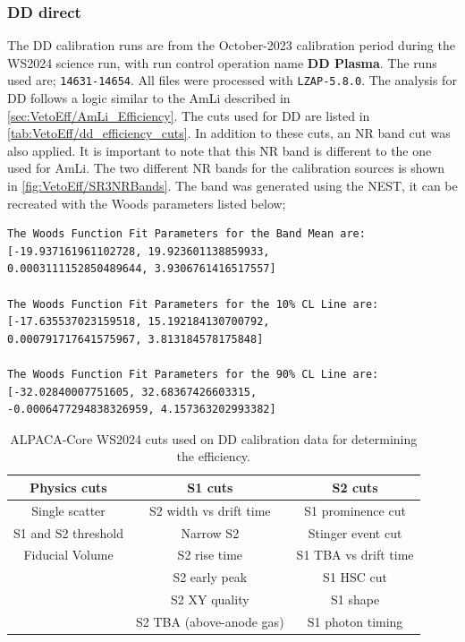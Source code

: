 \subsubsection{DD direct}
The DD calibration runs are from the October-2023 calibration period during the WS2024 science run, with run control operation name \textbf{DD Plasma}.
The runs used are; \lstinline{14631-14654}.
All files were processed with \lstinline{LZAP-5.8.0}.
The analysis for DD follows a logic similar to the AmLi described in \autoref{sec:VetoEff/AmLi_Efficiency}.
The cuts used for DD are listed in \autoref{tab:VetoEff/dd_efficiency_cuts}.
In addition to these cuts, an NR band cut was also applied.
It is important to note that this NR band is different to the one used for AmLi. The two different NR bands for the calibration sources is shown in \autoref{fig:VetoEff/SR3NRBands}.
The band was generated using the NEST, it can be recreated with the Woods parameters listed below;
\begin{lstlisting}[backgroundcolor = \color{lightgray}]
The Woods Function Fit Parameters for the Band Mean are:
[-19.937161961102728, 19.923601138859933,
0.0003111152850489644, 3.9306761416517557]

The Woods Function Fit Parameters for the 10% CL Line are:
[-17.635537023159518, 15.192184130700792,
0.000791717641575967, 3.813184578175848]

The Woods Function Fit Parameters for the 90% CL Line are:
[-32.02840007751605, 32.68367426603315,
-0.0006477294838326959, 4.157363202993382]
\end{lstlisting}
\begin{table}[!ht]
	\centering
	\caption{ALPACA-Core WS2024 cuts used on DD calibration data for determining the efficiency.}
	\begin{tabular}{|c|c|c|}
    \hline
	\textbf{Physics cuts}&\textbf{ S1 cuts}&\textbf{S2 cuts} \\
	\hline
	Single scatter & S2 width vs drift time & S1 prominence cut \\
	S1 and S2 threshold & Narrow S2 & Stinger event cut \\
	Fiducial Volume & S2 rise time & S1 TBA vs drift time \\
	& S2 early peak & S1 HSC cut \\
	& S2 XY quality & S1 shape \\
	& S2 TBA (above-anode gas) & S1 photon timing \\
    \hline
	\end{tabular}
	\label{tab:VetoEff/dd_efficiency_cuts}
\end{table}
